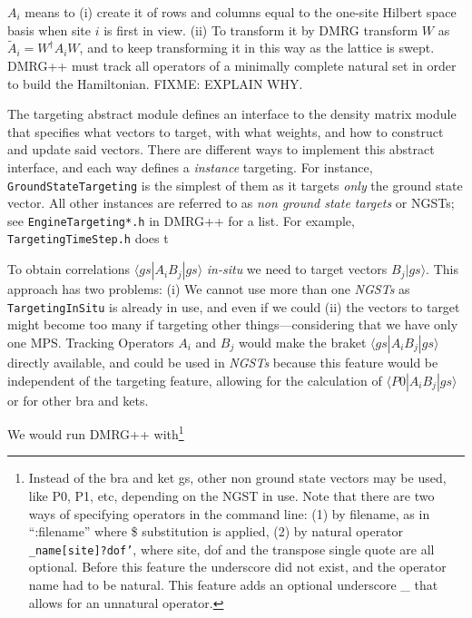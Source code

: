 \documentclass{article}
\begin{document}
$A_i$ means to (i) create it of rows and columns equal to the 
one-site Hilbert space basis when
site $i$ is first in view. (ii) To transform it by DMRG transform $W$ as
$\tilde{A}_i = W^\dagger A_i W$, and to keep transforming it in this way
as the lattice is swept. DMRG++ must track all operators
of a minimally complete
natural set in order to build the Hamiltonian. FIXME: EXPLAIN WHY.

The targeting abstract module defines an interface to the
density matrix module that specifies what vectors to target, with what
weights, and how to construct and update said vectors.
There are different ways to implement this abstract interface, and each
way defines a \emph{instance} targeting. For instance, \texttt{GroundStateTargeting}
is the simplest of them as it targets \emph{only} the ground state vector.
All other instances are referred to as \emph{non ground state targets} or NGSTs; 
see \texttt{EngineTargeting*.h} in DMRG++ for a list. For example, 
\texttt{TargetingTimeStep.h}
does t{}

 To obtain correlations $\langle gs| A_i B_j |gs\rangle$
\emph{in-situ} we need to target vectors $B_j |gs\rangle$.
This approach has two problems: (i) We cannot use more than one \emph{NGSTs}
as \texttt{TargetingInSitu} is already in use, and
even if we could (ii) the vectors to target might become too many if 
targeting other things---considering
that we have only one MPS. Tracking Operators $A_i$ and $B_j$ would make
the braket $\langle gs| A_i B_j |gs\rangle$ directly available, and could
be used in \emph{NGSTs} because this feature would be independent
of the targeting feature, allowing for the calculation of
 $\langle P0| A_i B_j |gs\rangle$ or for other bra and kets.

We would run DMRG++ with\footnote{Instead of the bra and ket gs, other
non ground state vectors may be used, like P0, P1, etc, depending on the
NGST in use. Note that there are two ways of specifying operators in
the command line: (1) by filename, as in ``:filename'' where \$ substitution
is applied, (2) by natural operator \texttt{\_name[site]?dof'}, where
site, dof and the transpose single quote are all optional. 
Before this feature the underscore did not exist, and the operator name
had to be natural. This feature
adds an optional underscore \_ that allows for an unnatural operator.}
\end{document}
